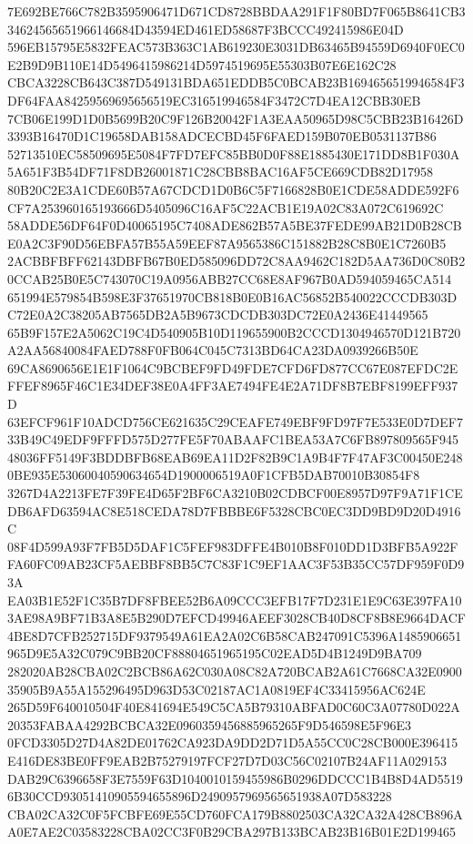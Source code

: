 \documentclass[UTF8,fontset=fandol,zihao=-4,a4paper]{ctexart}
\begin{document}
{{7E692BE766C782B3595906471D671CD8728BBDAA291F1F80BD7F065B8641CB334624565651966146684D43594ED461ED58687F3BCCC492415986E04D
596EB15795E5832FEAC573B363C1AB619230E3031DB63465B94559D6940F0EC0E2B9D9B110E14D5496415986214D5974519695E55303B07E6E162C28
CBCA3228CB643C387D549131BDA651EDDB5C0BCAB23B1694656519946584F3DF64FAA84259569695656519EC316519946584F3472C7D4EA12CBB30EB
7CB06E199D1D0B5699B20C9F126B20042F1A3EAA50965D98C5CBB23B16426D3393B16470D1C19658DAB158ADCECBD45F6FAED159B070EB0531137B86
52713510EC58509695E5084F7FD7EFC85BB0D0F88E1885430E171DD8B1F030A5A651F3B54DF71F8DB26001871C28CBB8BAC16AF5CE669CDB82D17958
80B20C2E3A1CDE60B57A67CDCD1D0B6C5F7166828B0E1CDE58ADDE592F6CF7A253960165193666D5405096C16AF5C22ACB1E19A02C83A072C619692C
58ADDE56DF64F0D40065195C7408ADE862B57A5BE37FEDE99AB21D0B28CBE0A2C3F90D56EBFA57B55A59EEF87A9565386C151882B28C8B0E1C7260B5
2ACBBFBFF62143DBFB67B0ED585096DD72C8AA9462C182D5AA736D0C80B20CCAB25B0E5C743070C19A0956ABB27CC68E8AF967B0AD594059465CA514
651994E579854B598E3F37651970CB818B0E0B16AC56852B540022CCCDB303DC72E0A2C38205AB7565DB2A5B9673CDCDB303DC72E0A2436E41449565
65B9F157E2A5062C19C4D540905B10D119655900B2CCCD1304946570D121B720A2AA56840084FAED788F0FB064C045C7313BD64CA23DA0939266B50E
69CA8690656E1E1F1064C9BCBEF9FD49FDE7CFD6FD877CC67E087EFDC2EFFEF8965F46C1E34DEF38E0A4FF3AE7494FE4E2A71DF8B7EBF8199EFF937D
63EFCF961F10ADCD756CE621635C29CEAFE749EBF9FD97F7E533E0D7DEF733B49C49EDF9FFFD575D277FE5F70ABAAFC1BEA53A7C6FB897809565F945
48036FF5149F3BDDBFB68EAB69EA11D2F82B9C1A9B4F7F47AF3C00450E2480BE935E53060040590634654D1900006519A0F1CFB5DAB70010B30854F8
3267D4A2213FE7F39FE4D65F2BF6CA3210B02CDBCF00E8957D97F9A71F1CEDB6AFD63594AC8E518CEDA78D7FBBBE6F5328CBC0EC3DD9BD9D20D4916C
08F4D599A93F7FB5D5DAF1C5FEF983DFFE4B010B8F010DD1D3BFB5A922FFA60FC09AB23CF5AEBBF8BB5C7C83F1C9EF1AAC3F53B35CC57DF959F0D93A
EA03B1E52F1C35B7DF8FBEE52B6A09CCC3EFB17F7D231E1E9C63E397FA103AE98A9BF71B3A8E5B290D7EFCD49946AEEF3028CB40D8CF8B8E9664DACF
4BE8D7CFB252715DF9379549A61EA2A02C6B58CAB247091C5396A1485906651965D9E5A32C079C9BB20CF88804651965195C02EAD5D4B1249D9BA709
282020AB28CBA02C2BCB86A62C030A08C82A720BCAB2A61C7668CA32E090035905B9A55A155296495D963D53C02187AC1A0819EF4C33415956AC624E
265D59F640010504F40E841694E549C5CA5B79310ABFAD0C60C3A07780D022A20353FABAA4292BCBCA32E0960359456885965265F9D546598E5F96E3
0FCD3305D27D4A82DE01762CA923DA9DD2D71D5A55CC0C28CB000E396415E416DE83BE0FF9EAB2B75279197FCF27D7D03C56C02107B24AF11A029153
DAB29C6396658F3E7559F63D1040010159455986B0296DDCCC1B4B8D4AD55196B30CCD93051410905594655896D2490957969565651938A07D583228
CBA02CA32C0F5FCBFE69E55CD760FCA179B8802503CA32CA32A428CB896AA0E7AE2C03583228CBA02CC3F0B29CBA297B133BCAB23B16B01E2D199465
}}
\end{document}
